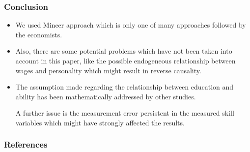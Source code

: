 \documentclass[11pt]{beamer}
\begin{document}
\begin{frame}[t]
	\frametitle{Conclusion}
	 \begin{itemize}
	 	\item We used Mincer approach which is only one of many approaches
followed by the economists.

		\item Also, there are some potential problems which have not been taken
into account in this paper, like the possible endogeneous relationship
between wages and personality which might result in reverse
causality.

		\item The assumption made regarding the relationship between education
and ability has been mathematically addressed by other studies.

A further issue is the measurement error persistent in the measured
skill variables which might have strongly affected the results.
	\end{itemize}
\end{frame}
 {
    \begin{frame}
        \frametitle{}
    \end{frame}

}

\begin{frame}[allowframebreaks]
    \frametitle{References}
    
    \renewcommand{\bibfont}{\normalfont\footnotesize}
    \printbibliography
    
    
\end{frame}
\end{document}
